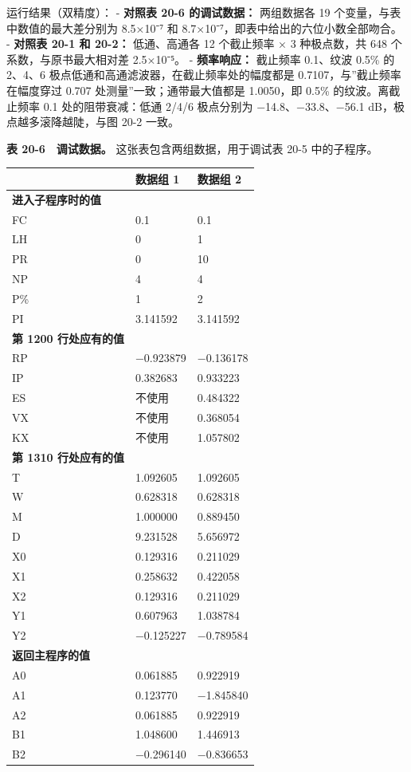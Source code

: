 运行结果（双精度）： - \textbf{对照表 20-6 的调试数据：} 两组数据各 19
个变量，与表中数值的最大差分别为 8.5×10⁻⁷ 和
8.7×10⁻⁷，即表中给出的六位小数全部吻合。 - \textbf{对照表 20-1 和
20-2：} 低通、高通各 12 个截止频率 × 3 种极点数，共 648
个系数，与原书最大相对差 2.5×10⁻⁵。 - \textbf{频率响应：} 截止频率
0.1、纹波 0.5\% 的 2、4、6 极点低通和高通滤波器，在截止频率处的幅度都是
0.7107，与''截止频率在幅度穿过 0.707 处测量''一致；通带最大值都是
1.0050，即 0.5\% 的纹波。离截止频率 0.1 处的阻带衰减：低通 2/4/6
极点分别为 −14.8、−33.8、−56.1 dB，极点越多滚降越陡，与图 20-2 一致。

\textbf{表 20-6　调试数据。} 这张表包含两组数据，用于调试表 20-5
中的子程序。

{\def\LTcaptype{none} %
\begin{longtable}[]{@{}lll@{}}
\toprule\noalign{}
& 数据组 1 & 数据组 2 \\
\midrule\noalign{}
\endhead
\bottomrule\noalign{}
\endlastfoot
\textbf{进入子程序时的值} & & \\
FC & 0.1 & 0.1 \\
LH & 0 & 1 \\
PR & 0 & 10 \\
NP & 4 & 4 \\
P\% & 1 & 2 \\
PI & 3.141592 & 3.141592 \\
\textbf{第 1200 行处应有的值} & & \\
RP & −0.923879 & −0.136178 \\
IP & 0.382683 & 0.933223 \\
ES & 不使用 & 0.484322 \\
VX & 不使用 & 0.368054 \\
KX & 不使用 & 1.057802 \\
\textbf{第 1310 行处应有的值} & & \\
T & 1.092605 & 1.092605 \\
W & 0.628318 & 0.628318 \\
M & 1.000000 & 0.889450 \\
D & 9.231528 & 5.656972 \\
X0 & 0.129316 & 0.211029 \\
X1 & 0.258632 & 0.422058 \\
X2 & 0.129316 & 0.211029 \\
Y1 & 0.607963 & 1.038784 \\
Y2 & −0.125227 & −0.789584 \\
\textbf{返回主程序的值} & & \\
A0 & 0.061885 & 0.922919 \\
A1 & 0.123770 & −1.845840 \\
A2 & 0.061885 & 0.922919 \\
B1 & 1.048600 & 1.446913 \\
B2 & −0.296140 & −0.836653 \\
\end{longtable}
}
